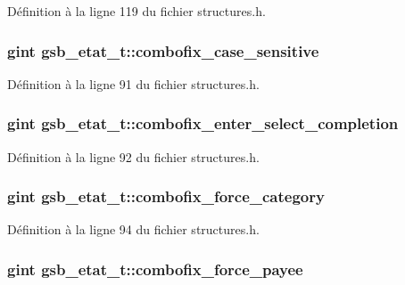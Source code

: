 Définition à la ligne 119 du fichier structures.h.

\subsubsection[{combofix\_\-case\_\-sensitive}]{\setlength{\rightskip}{0pt plus 5cm}gint {\bf gsb\_\-etat\_\-t::combofix\_\-case\_\-sensitive}}\label{structgsb__etat__t_a125b6acef0ed7c3675d331ebb36ee373}


Définition à la ligne 91 du fichier structures.h.

\subsubsection[{combofix\_\-enter\_\-select\_\-completion}]{\setlength{\rightskip}{0pt plus 5cm}gint {\bf gsb\_\-etat\_\-t::combofix\_\-enter\_\-select\_\-completion}}\label{structgsb__etat__t_a5b4d8e9fb0ca2d1d3bd9a4ab2e41df7e}


Définition à la ligne 92 du fichier structures.h.

\subsubsection[{combofix\_\-force\_\-category}]{\setlength{\rightskip}{0pt plus 5cm}gint {\bf gsb\_\-etat\_\-t::combofix\_\-force\_\-category}}\label{structgsb__etat__t_a438d5f681d3caeb050f58d3731f8d913}


Définition à la ligne 94 du fichier structures.h.

\subsubsection[{combofix\_\-force\_\-payee}]{\setlength{\rightskip}{0pt plus 5cm}gint {\bf gsb\_\-etat\_\-t::combofix\_\-force\_\-payee}}\label{structgsb__etat__t_a2d144af514bb01efa489541db464bc80}


